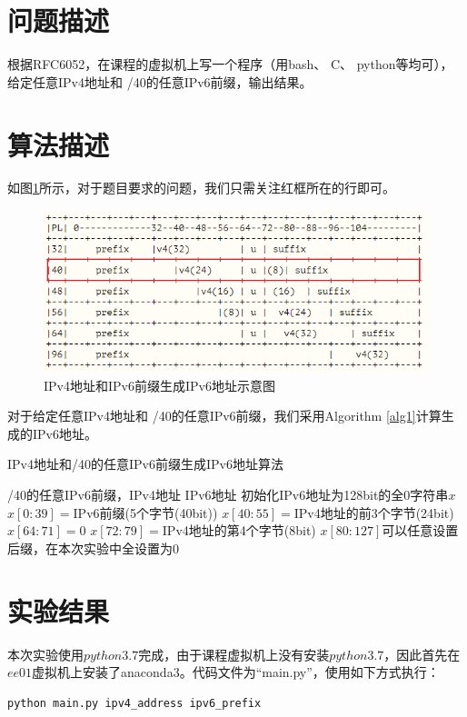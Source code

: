 \documentclass[12pt,letterpaper]{article}
\begin{document}
\section{问题描述}
根据RFC6052，在课程的虚拟机上写一个程序（用bash、 C、 python等均可），给定任意IPv4地址和 /40的任意IPv6前缀，输出结果。

\section{算法描述}
如图\ref{algo}所示，对于题目要求的问题，我们只需关注红框所在的行即可。
\begin{figure}[!h]
	\centering
	\includegraphics[width=\linewidth]{algo}
	\caption{\label{algo}IPv4地址和IPv6前缀生成IPv6地址示意图}
\end{figure}

对于给定任意IPv4地址和 /40的任意IPv6前缀，我们采用Algorithm \ref{alg1}计算生成的IPv6地址。
\begin{algorithm}[H]
	\caption{\label{alg1}IPv4地址和/40的任意IPv6前缀生成IPv6地址算法}
	\begin{algorithmic}[1]
		\Require /40的任意IPv6前缀，IPv4地址
		\Ensure IPv6地址
		\State 初始化IPv6地址为128bit的全0字符串$x$
		\State $x[0:39]=$IPv6前缀(5个字节(40bit))
		\State $x[40:55]=$IPv4地址的前3个字节(24bit)
		\State $x[64:71]=0$
		\State $x[72:79]=$IPv4地址的第4个字节(8bit)
		\State $x[80:127]$可以任意设置后缀，在本次实验中全设置为0
	\end{algorithmic}
\end{algorithm}

\section{实验结果}
本次实验使用$python3.7$完成，由于课程虚拟机上没有安装$python3.7$，因此首先在$ee01$虚拟机上安装了anaconda3。代码文件为``main.py''，使用如下方式执行：
\begin{lstlisting}
python main.py ipv4_address ipv6_prefix
\end{lstlisting}
\end{document}
